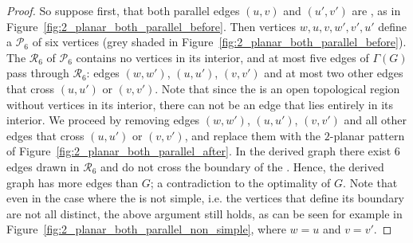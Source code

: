 \begin{proof}
So suppose first, that both parallel edges $(u,v)$ and $(u',v')$ are \pes, as in Figure~\ref{fig:2_planar_both_parallel_before}. Then vertices $w,u,v,w',v',u'$ define a \pp $\mathcal{P}_6$ of six vertices (grey shaded in Figure~\ref{fig:2_planar_both_parallel_before}). The \pr $\mathcal{R}_6$ of $\mathcal{P}_6$ contains no vertices in its interior, and at most five edges of $\Gamma(G)$ pass through $\mathcal{R}_6$: edges $(w,w')$, $(u,u')$, $(v,v')$ and at most two other edges that cross $(u,u')$ or $(v,v')$. Note that since the \pr is an open topological region without vertices in its interior, there can not be an edge that lies entirely in its interior. We proceed by removing  edges $(w,w')$, $(u,u')$, $(v,v')$ and all other edges that cross $(u,u')$ or $(v,v')$, and replace them with the $2$-planar pattern of Figure~\ref{fig:2_planar_both_parallel_after}. In the derived graph there exist $6$ edges drawn in $\mathcal{R}_6$ and do not cross the boundary of the \pp. Hence, the derived graph has more edges than $G$; a contradiction to the optimality of $G$. Note that even in the case where the \pp is not simple, i.e. the vertices that define its boundary are not all distinct, the above argument still holds, as can be seen for example in Figure~\ref{fig:2_planar_both_parallel_non_simple}, where $w=u$ and $v=v'$.


\end{proof}

